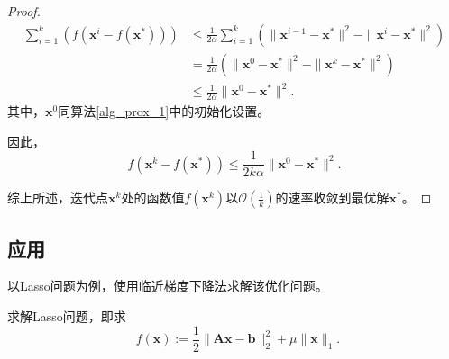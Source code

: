 \begin{proof}
\begin{equation}
        \begin{split}
            \sum_{i=1}^{k}(f(\bm{x}^{i} - f(\bm{x}^{*}))) &\leq \frac{1}{2\alpha}\sum_{i=1}^{k}(\|\bm{x}^{i-1}-\bm{x}^{*}\|^{2} - \|\bm{x}^{i}-\bm{x}^{*}\|^{2}) \\
            &= \frac{1}{2\alpha}(\|\bm{x}^{0}-\bm{x}^{*}\|^{2} - \|\bm{x}^{k}-\bm{x}^{*}\|^{2}) \\
            &\leq \frac{1}{2\alpha} \|\bm{x}^{0} - \bm{x}^{*}\|^{2}.
        \end{split}
        \nonumber
    \end{equation}
    其中，$\bm{x}^{0}$同算法\ref{alg_prox_1}中的初始化设置。
    \par 因此，
    \begin{equation}
        f(\bm{x}^{k}-f(\bm{x}^{*})) \leq \frac{1}{2k\alpha}\|\bm{x}^{0}-\bm{x}^{*}\|^{2}.
    \end{equation}

    综上所述，迭代点$\bm{x}^{k}$处的函数值$f(\bm{x}^{k})$以$\mathcal{O}(\frac{1}{k})$的速率收敛到最优解$\bm{x}^{*}$。
\end{proof}

\subsection{应用}

以Lasso问题为例，使用临近梯度下降法求解该优化问题。

\begin{problem}
    求解Lasso问题，即求
    \begin{equation}
        \mathop{\mathrm{min}\limits_{\bm{x}}} f(\bm{x}) := \frac{1}{2}\|\bm{A} \bm{x}-\bm{b}\|_{2}^{2} + \mu\|\bm{x}\|_{1}.
    \end{equation}
\end{problem}

